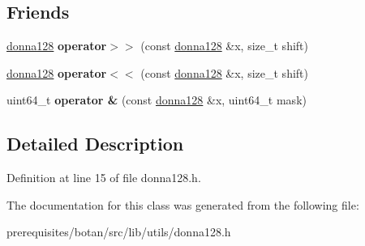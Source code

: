 \subsection*{Friends}
\begin{DoxyCompactItemize}
\item 
\mbox{\label{class_botan_1_1donna128_a6cb5878473e0c0564e237a4845c3e9cf}} 
\mbox{\hyperlink{class_botan_1_1donna128}{donna128}} {\bfseries operator$>$$>$} (const \mbox{\hyperlink{class_botan_1_1donna128}{donna128}} \&x, size\+\_\+t shift)
\item 
\mbox{\label{class_botan_1_1donna128_a0cc4466994b8b99ce51815addd00ade6}} 
\mbox{\hyperlink{class_botan_1_1donna128}{donna128}} {\bfseries operator$<$$<$} (const \mbox{\hyperlink{class_botan_1_1donna128}{donna128}} \&x, size\+\_\+t shift)
\item 
\mbox{\label{class_botan_1_1donna128_a96db264b4dc2a56d79dc86682e0db162}} 
uint64\+\_\+t {\bfseries operator \&} (const \mbox{\hyperlink{class_botan_1_1donna128}{donna128}} \&x, uint64\+\_\+t mask)
\end{DoxyCompactItemize}


\subsection{Detailed Description}


Definition at line 15 of file donna128.\+h.



The documentation for this class was generated from the following file\+:\begin{DoxyCompactItemize}
\item 
prerequisites/botan/src/lib/utils/donna128.\+h\end{DoxyCompactItemize}
